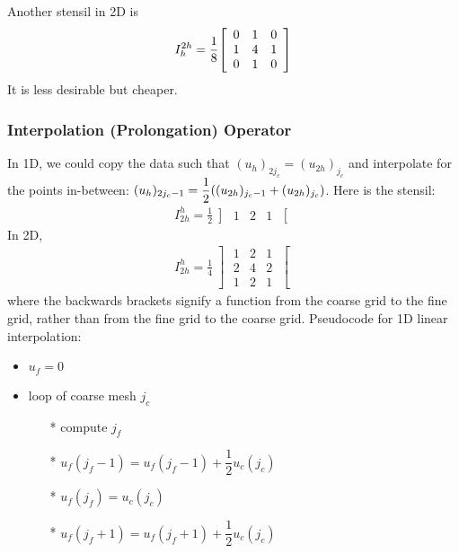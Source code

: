 \documentclass{article}
\begin{document}
                Another stensil in 2D is
                \begin{align*}
                    I_h^{2h} = \frac{1}{8}\qty[\begin{array}{ccc}
                        0 & 1 & 0 \\ 1 & 4 & 1 \\ 0 & 1 & 0
                    \end{array}]
                \end{align*}
                It is less desirable but cheaper.

            \subsubsection{Interpolation (Prolongation) Operator}
                In 1D, we could copy the data such that $(u_h)_{2j_c} = (u_{2h})_{j_c}$ and interpolate for the points in-between: $(u_h)_{2j_c-1} = \dfrac{1}{2}\qty((u_{2h})_{j_c-1} + (u_{2h})_{j_c})$.  Here is the stensil:
                \begin{align*}
                    I_{2h}^h = \frac{1}{2}\left]\begin{array}{ccc} 1 & 2 & 1 \end{array}\right[
                \end{align*}
                In 2D,
                \begin{align*}
                    I_{2h}^h = \frac{1}{4}\left]\begin{array}{ccc} 1 & 2 & 1 \\ 2 & 4 & 2 \\ 1 & 2 & 1\end{array}\right[
                \end{align*}
                where the backwards brackets signify a function from the coarse grid to the fine grid, rather than from the fine grid to the coarse grid.  Pseudocode for 1D linear interpolation:
                \begin{itemize}
                    \item $u_f = 0$
                    \item loop of coarse mesh $j_c$
                    \begin{itemize}
                        \item[*] compute $j_f$
                        \item[*] $u_f(j_f - 1) = u_f(j_f - 1) + \dfrac{1}{2}u_c(j_c)$
                        \item[*] $u_f(j_f) = u_c(j_c)$
                        \item[*] $u_f(j_f + 1) = u_f(j_f + 1) + \dfrac{1}{2}u_c(j_c)$
                    \end{itemize}
                \end{itemize}
\end{document}
